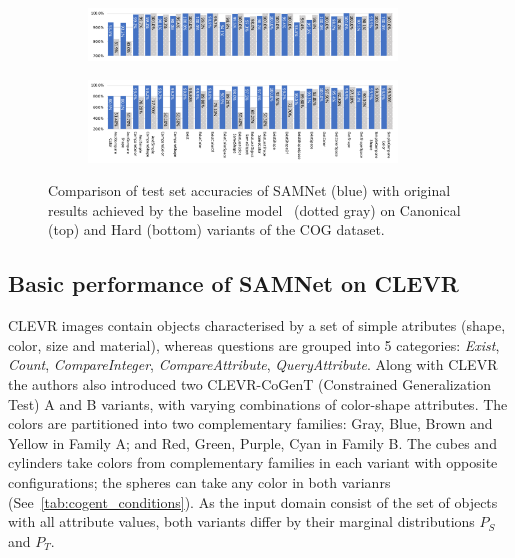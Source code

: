 \begin{figure}[t!]
	\centering
	\begin{subfigure}{\textwidth}
		\centering
		\includegraphics[width=0.9\textwidth]{../img/plots/cog_canonical_baseline_no_labels.pdf}
	\end{subfigure}%
	\newline
	\begin{subfigure}{\textwidth}
		\centering
		\includegraphics[width=0.9\textwidth]{../img/plots/cog_hard_baseline_labels.pdf}
	\end{subfigure}%
	\caption{Comparison of test set accuracies of SAMNet (blue) with original results achieved by the baseline model~\cite{yang2018dataset} (dotted gray) on Canonical (top) and Hard (bottom) variants of the COG dataset.}
	\label{fig:samnet_cog_detailed}
\end{figure}

\subsection{Basic performance of SAMNet on CLEVR}
\label{sec:clevr-baseline-compare}
CLEVR images contain objects characterised by a set of simple atributes (shape, color, size and material), whereas questions are grouped into 5 categories: \textit{Exist}, \textit{Count}, \textit{CompareInteger}, \textit{CompareAttribute}, \textit{QueryAttribute}.
Along with CLEVR the authors also introduced two CLEVR-CoGenT (Constrained Generalization Test) A and B variants, with varying combinations of color-shape attributes.
The colors are partitioned into two complementary families:
Gray, Blue, Brown and Yellow in Family A; and Red, Green, Purple, Cyan in Family B.
The cubes and cylinders take colors from complementary families in each variant with opposite configurations; the spheres can take any color in both varianrs (See~\cref{tab:cogent_conditions}).
As the input domain consist of the set of objects with all attribute values, both variants differ by their marginal distributions $P_S$ and $P_T$.

